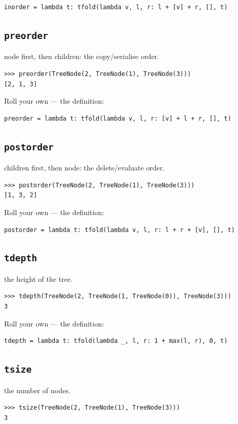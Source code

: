 \documentclass[10pt,letterpaper]{book}
\begin{document}
\begin{lstlisting}[style=ex]
inorder = lambda t: tfold(lambda v, l, r: l + [v] + r, [], t)
\end{lstlisting}
\subsection{\texttt{preorder}}\label{def:preorder}
node first, then children: the copy/serialise order.
\begin{lstlisting}[style=ex]
>>> preorder(TreeNode(2, TreeNode(1), TreeNode(3)))
[2, 1, 3]
\end{lstlisting}

Roll your own --- the definition:

\begin{lstlisting}[style=ex]
preorder = lambda t: tfold(lambda v, l, r: [v] + l + r, [], t)
\end{lstlisting}
\subsection{\texttt{postorder}}\label{def:postorder}
children first, then node: the delete/evaluate order.
\begin{lstlisting}[style=ex]
>>> postorder(TreeNode(2, TreeNode(1), TreeNode(3)))
[1, 3, 2]
\end{lstlisting}

Roll your own --- the definition:

\begin{lstlisting}[style=ex]
postorder = lambda t: tfold(lambda v, l, r: l + r + [v], [], t)
\end{lstlisting}
\subsection{\texttt{tdepth}}\label{def:tdepth}
the height of the tree.
\begin{lstlisting}[style=ex]
>>> tdepth(TreeNode(2, TreeNode(1, TreeNode(0)), TreeNode(3)))
3
\end{lstlisting}

Roll your own --- the definition:

\begin{lstlisting}[style=ex]
tdepth = lambda t: tfold(lambda _, l, r: 1 + max(l, r), 0, t)
\end{lstlisting}
\subsection{\texttt{tsize}}\label{def:tsize}
the number of nodes.
\begin{lstlisting}[style=ex]
>>> tsize(TreeNode(2, TreeNode(1), TreeNode(3)))
3
\end{lstlisting}
\end{document}
